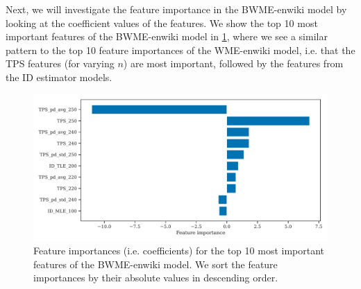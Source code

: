 Next, we will investigate the feature importance in the BWME-enwiki model by looking at the coefficient values of the features. We show the top 10 most important features of the BWME-enwiki model in \cref{fig:bwme-enwiki-feature-importances}, where we see a similar pattern to the top 10 feature importances of the WME-enwiki model, i.e. that the TPS features (for varying $n$) are most important, followed by the features from the ID estimator models.
\begin{figure}[H]
    \centering
    \includegraphics[width=\textwidth]{thesis/figures/bwme-enwiki-top-10-feature-importances.pdf}
    \caption{Feature importances (i.e. coefficients) for the top 10 most important features of the BWME-enwiki model. We sort the feature importances by their absolute values in descending order.}
    \label{fig:bwme-enwiki-feature-importances}
\end{figure}

